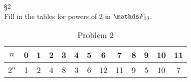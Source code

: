 \documentclass{homework}
\begin{document}
\begin{problem}{\S 2}\\
  Fill in the tables for powers of $2$ in $\F_{13}$.
\end{problem}

\begin{solution}
  \begin{table}[htpb]
    \centering
    \caption{Problem 2}
    \begin{tabular}{c||c|c|c|c|c|c|c|c|c|c|c|c}
          $n$ & 0 & 1 & 2 & 3 & 4 & 5 & 6 & 7 & 8 & 9 & 10 & 11 \\
      \toprule \bottomrule
          $2^{n}$ & 1 & 2 & 4 & 8 & 3 & 6 & 12 & 11 & 9 & 5 & 10 & 7
    \end{tabular}
  \end{table}
\end{solution}
\end{document}
